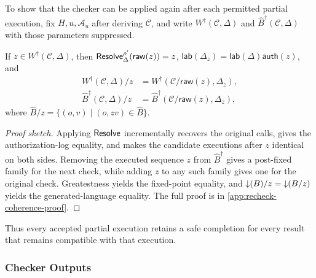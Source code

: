 To show that the checker can be applied again after each permitted partial execution, fix \(H,u,\mathcal A_u\) after deriving \(\mathcal C\), and write \(W^\dagger(\mathcal C,\Delta)\) and \(\widehat B^\dagger(\mathcal C,\Delta)\) with those parameters suppressed.
\begin{lemma}
\label{lem:recheck-coherence}
If \(z\in W^\dagger(\mathcal C,\Delta)\), then
\(\mathsf{Resolve}^{\rho'}_\Delta(\mathsf{raw}(z))=z\),
\(\mathsf{lab}(\Delta_z)=
 \mathsf{lab}(\Delta)\mathsf{auth}(z)\), and
\[
\begin{aligned}
 W^\dagger(\mathcal C,\Delta)/z
  &=W^\dagger(\mathcal C/\mathsf{raw}(z),\Delta_z),\\
 \widehat B^\dagger(\mathcal C,\Delta)/z
  &=\widehat B^\dagger(
      \mathcal C/\mathsf{raw}(z),\Delta_z),
\end{aligned}
\]
where
\(\widehat B/z=\{(o,v)\mid(o,zv)\in\widehat B\}\).
\end{lemma}
\begin{proof}[Proof sketch]
Applying \(\mathsf{Resolve}\) incrementally recovers the original calls, gives the authorization-log equality, and makes the candidate executions after \(z\) identical on both sides.
Removing the executed sequence \(z\) from \(\widehat B^\dagger\) gives a post-fixed family for the next check, while adding \(z\) to any such family gives one for the original check.
Greatestness yields the fixed-point equality, and \(\mathord{\downarrow}(B)/z=\mathord{\downarrow}(B/z)\) yields the generated-language equality.
The full proof is in \cref{app:recheck-coherence-proof}.
\end{proof}
Thus every accepted partial execution retains a safe completion for every result that remains compatible with that execution.

\subsubsection{Checker Outputs}

